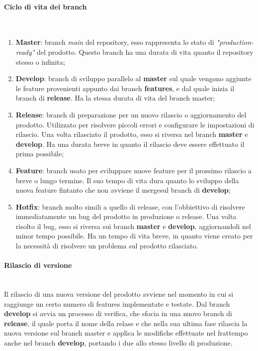 \paragraph{Ciclo di vita dei branch} \-\\
\begin{enumerate}
	
	\item \textbf{Master}: branch \textit{main} del repository, esso rappresenta lo stato di \textit{"production-ready"} del prodotto. Questo branch ha una durata di vita quanto il repository stesso o infinita;
	\item \textbf{Develop}: branch di sviluppo parallelo al \textbf{master} sul quale vengono aggiunte le feature provenienti appunto dai branch \textbf{features}, e dal quale inizia il branch di \textbf{release}. Ha la stessa durata di vita del branch master;
	 
	\item \textbf{Release}: branch di preparazione per un nuovo rilascio o aggiornamento del prodotto. 
	Utilizzato per risolvere piccoli errori e configurare le impostazioni di rilascio. Una volta rilasciato il 
	prodotto, esso si riversa nel branch \textbf{master} e \textbf{develop}. Ha una durata breve in quanto il rilascio deve essere effettuato il prima possibile;

	\item \textbf{Feature}: branch usato per sviluppare nuove feature per il prossimo rilascio a breve o lungo termine. Il suo tempo di vita dura quanto lo sviluppo della nuova feature
	fintanto che non avviene il merge\glossario sul branch di \textbf{develop};

	\item \textbf{Hotfix}: branch molto simili a quello di release, con l'obbiettivo di risolvere immediatamente un bug del prodotto in produzione o release. Una volta risolto il bug, 
	esso si riversa sui branch \textbf{master} e \textbf{develop}, aggiornandoli nel minor tempo possibile. Ha un tempo di vita breve, in quanto viene creato per la necessità di risolvere 
	un problema sul prodotto rilasciato. 
	
\end{enumerate}


\paragraph{Rilascio di versione} \-\\
Il rilascio di una nuova versione del prodotto avviene nel momento in cui si raggiunge un certo numero di features implementate e testate. 
Dal branch \textbf{develop} si avvia un processo di verifica, che sfocia in una nuovo branch di \textbf{release}, il quale porta il nome della relase e che nella sua ultima fase rilascia la nuova versione sul branch master e applica le modifiche effettuate nel frattempo anche nel branch \textbf{develop}, portando i due allo stesso livello di produzione. 

